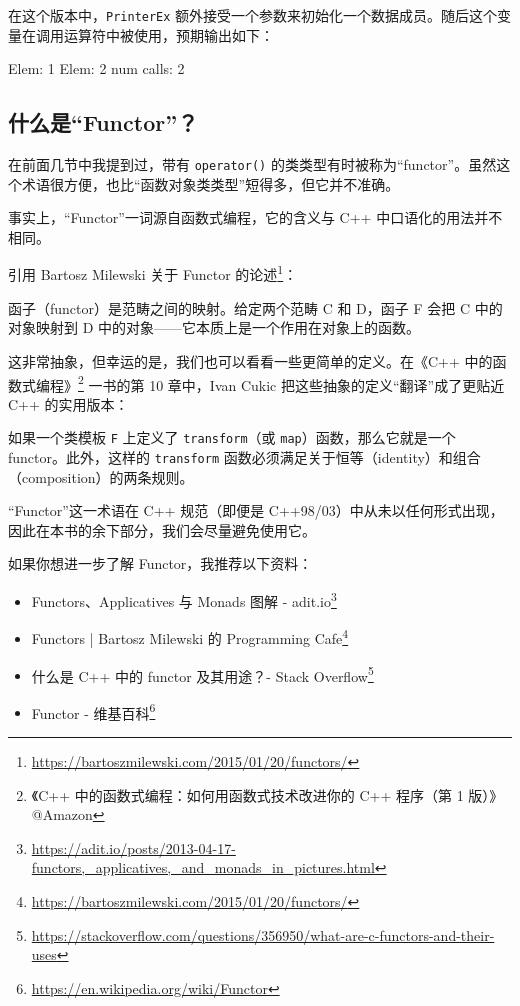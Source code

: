 在这个版本中，\texttt{PrinterEx} 额外接受一个参数来初始化一个数据成员。随后这个变量在调用运算符中被使用，预期输出如下：

\begin{codebox}
Elem: 1
Elem: 2
num calls: 2
\end{codebox}

\subsection{什么是“Functor”？}

在前面几节中我提到过，带有 \texttt{operator()} 的类类型有时被称为“functor”。虽然这个术语很方便，也比“函数对象类类型”短得多，但它并不准确。

事实上，“Functor”一词源自函数式编程，它的含义与 C++ 中口语化的用法并不相同。

引用 Bartosz Milewski 关于 Functor 的论述\footnote{\url{https://bartoszmilewski.com/2015/01/20/functors/}}：

\begin{myQuote}
函子（functor）是范畴之间的映射。给定两个范畴 C 和 D，函子 F 会把 C 中的对象映射到 D 中的对象——它本质上是一个作用在对象上的函数。
\end{myQuote}

这非常抽象，但幸运的是，我们也可以看看一些更简单的定义。在《C++ 中的函数式编程》\footnote{《C++ 中的函数式编程：如何用函数式技术改进你的 C++ 程序（第 1 版）》@Amazon} 一书的第 10 章中，Ivan Cukic 把这些抽象的定义“翻译”成了更贴近 C++ 的实用版本：

如果一个类模板 \texttt{F} 上定义了 \texttt{transform}（或 \texttt{map}）函数，那么它就是一个 functor。此外，这样的 \texttt{transform} 函数必须满足关于恒等（identity）和组合（composition）的两条规则。

“Functor”这一术语在 C++ 规范（即便是 C++98/03）中从未以任何形式出现，因此在本书的余下部分，我们会尽量避免使用它。

如果你想进一步了解 Functor，我推荐以下资料：

\begin{itemize}
\item Functors、Applicatives 与 Monads 图解 - adit.io\footnote{\url{https://adit.io/posts/2013-04-17-functors,_applicatives,_and_monads_in_pictures.html}}
\item Functors | Bartosz Milewski 的 Programming Cafe\footnote{\url{https://bartoszmilewski.com/2015/01/20/functors/}}
\item 什么是 C++ 中的 functor 及其用途？- Stack Overflow\footnote{\url{https://stackoverflow.com/questions/356950/what-are-c-functors-and-their-uses}}
\item Functor - 维基百科\footnote{\url{https://en.wikipedia.org/wiki/Functor}}
\end{itemize}

